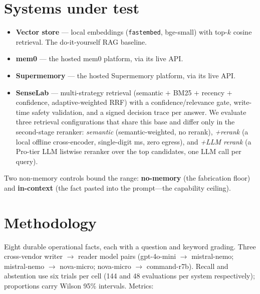 \documentclass[11pt]{article}
\begin{document}
\section{Systems under test}

\begin{itemize}[topsep=2pt,itemsep=1pt]
\item \textbf{Vector store} --- local embeddings (\texttt{fastembed}, bge-small) with top-$k$ cosine
  retrieval. The do-it-yourself RAG baseline.
\item \textbf{mem0} --- the hosted mem0 platform, via its live API.
\item \textbf{Supermemory} --- the hosted Supermemory platform, via its live API.
\item \textbf{SenseLab} --- multi-strategy retrieval (semantic $+$ BM25 $+$ recency $+$ confidence,
  adaptive-weighted RRF) with a confidence/relevance gate, write-time safety validation, and a signed
  decision trace per answer. We evaluate three retrieval configurations that share this base and differ
  only in the second-stage reranker: \emph{semantic} (semantic-weighted, no rerank), \emph{+rerank} (a
  local offline cross-encoder, single-digit ms, zero egress), and \emph{+LLM rerank} (a Pro-tier LLM
  listwise reranker over the top candidates, one LLM call per query).
\end{itemize}

\noindent Two non-memory controls bound the range: \textbf{no-memory} (the fabrication floor) and
\textbf{in-context} (the fact pasted into the prompt---the capability ceiling).

\section{Methodology}

Eight durable operational facts, each with a question and keyword grading. Three cross-vendor writer
$\rightarrow$ reader model pairs (gpt-4o-mini $\rightarrow$ mistral-nemo; mistral-nemo $\rightarrow$
nova-micro; nova-micro $\rightarrow$ command-r7b). Recall and abstention use six trials per cell (144
and 48 evaluations per system respectively); proportions carry Wilson 95\% intervals. Metrics:
\end{document}
